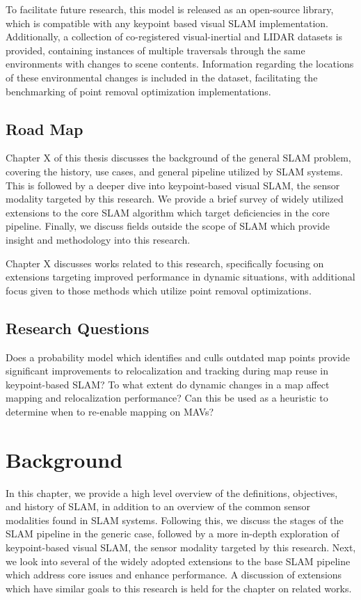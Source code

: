 \documentclass[12pt]{article}
\begin{document}
To facilitate future research, this model is released as an open-source library, which is compatible with any keypoint based visual SLAM implementation. Additionally, a collection of co-registered visual-inertial and LIDAR datasets is provided, containing instances of multiple traversals through the same environments with changes to scene contents. Information regarding the locations of these environmental changes is included in the dataset, facilitating the benchmarking of point removal optimization implementations.

\subsection{Road Map}

Chapter X of this thesis discusses the background of the general SLAM problem, covering the history, use cases, and general pipeline utilized by SLAM systems. This is followed by a deeper dive into keypoint-based visual SLAM, the sensor modality targeted by this research. We provide a brief survey of widely utilized extensions to the core SLAM algorithm which target deficiencies in the core pipeline. Finally, we discuss fields outside the scope of SLAM which provide insight and methodology into this research.

Chapter X discusses works related to this research, specifically focusing on extensions targeting improved performance in dynamic situations, with additional focus given to those methods which utilize point removal optimizations.

\subsection{Research Questions}

Does a probability model which identifies and culls outdated map points provide significant improvements to relocalization and tracking during map reuse in keypoint-based SLAM?
To what extent do dynamic changes in a map affect mapping and relocalization performance?
Can this be used as a heuristic to determine when to re-enable mapping on MAVs?

\section{Background}

In this chapter, we provide a high level overview of the definitions, objectives, and history of SLAM, in addition to an overview of the common sensor modalities found in SLAM systems. Following this, we discuss the stages of the SLAM pipeline in the generic case, followed by a more in-depth exploration of keypoint-based visual SLAM, the sensor modality targeted by this research. Next, we look into several of the widely adopted extensions to the base SLAM pipeline which address core issues and enhance performance. A discussion of extensions which have similar goals to this research is held for the chapter on related works.
\end{document}
